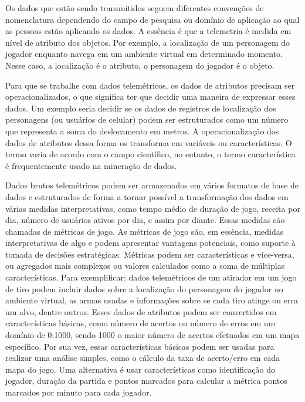 Os dados que estão sendo transmitidos seguem diferentes convenções de nomenclatura dependendo do campo de pesquisa ou domínio de aplicação ao qual as pessoas estão aplicando os dados. A essência é que a telemetria é medida em nível de atributo dos objetos. Por exemplo, a localização de um personagem do jogador enquanto navega em um ambiente virtual em determinado momento. Nesse caso, a localização é o atributo, o personagem do jogador é o objeto.

Para que se trabalhe com dados telemétricos, os dados de atributos precisam ser operacionalizados, o que significa ter que decidir uma maneira de expressar esses dados. Um exemplo seria decidir se os dados de registros de localização dos personagens (ou usuários de celular) podem ser estruturados como um número que representa a soma do deslocamento em metros. A operacionalização dos dados de atributos dessa forma os transforma em variáveis ou características. O termo varia de acordo com o campo científico, no entanto, o termo característica é frequentemente usado na mineração de dados.

Dados brutos telemétricos podem ser armazenados em vários formatos de base de dados e estruturados de forma a tornar possível a transformação dos dados em várias medidas interpretativas, como tempo médio de duração de jogo, receita por dia, número de usuários ativos por dia, e assim por diante. Essas medidas são chamadas de métricas de jogo. As métricas de jogo são, em essência, medidas interpretativas de algo e podem apresentar vantagens potenciais, como suporte à tomada de decisões estratégicas. Métricas podem ser características e vice-versa, ou agregados mais complexos ou valores calculados como a soma de múltiplas características. Para exemplificar: dados telemétricos de um atirador em um jogo de tiro podem incluir dados sobre a localização do personagem do jogador no ambiente virtual, as armas usadas e informações sobre se cada tiro atinge ou erra um alvo, dentre outros. Esses dados de atributos podem ser convertidos em características básicas, como número de acertos ou número de erros em um domínio de 0:1000, sendo 1000 o maior número de acertos efetuados em um mapa específico. Por sua vez, essas características básicas podem ser usadas para realizar uma análise simples, como o cálculo da taxa de acerto/erro em cada mapa do jogo. Uma alternativa é usar características como identificação do jogador, duração da partida e pontos marcados para calcular a métrica pontos marcados por minuto para cada jogador.

